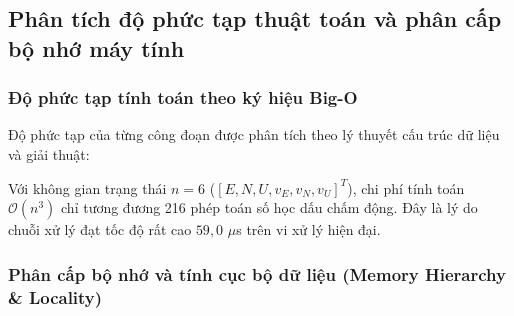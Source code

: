 \subsection{Phân tích độ phức tạp thuật toán và phân cấp bộ nhớ máy tính}

\subsubsection{Độ phức tạp tính toán theo ký hiệu Big-O}

\hspace{0.5cm} Độ phức tạp của từng công đoạn được phân tích theo lý thuyết cấu trúc dữ liệu và giải thuật:

\begin{table}[H]
\centering
\caption{Độ phức tạp thời gian và không gian của các phân hệ thuật toán}
\label{tab:complexity}
\end{table}

Với không gian trạng thái $n=6$ ($[E, N, U, v_E, v_N, v_U]^T$), chi phí tính toán $\mathcal{O}(n^3)$ chỉ tương đương 216 phép toán số học dấu chấm động. Đây là lý do chuỗi xử lý đạt tốc độ rất cao $59{,}0$ $\mu$s trên vi xử lý hiện đại.

\subsubsection{Phân cấp bộ nhớ và tính cục bộ dữ liệu (Memory Hierarchy \texorpdfstring{\&}{và} Locality)}


